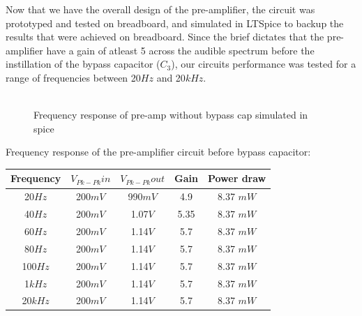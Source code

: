 \documentclass[a4paper,11pt]{article}
\begin{document}
Now that we have the overall design of the pre-amplifier, the circuit was prototyped and tested on breadboard, and simulated in LTSpice to backup the results that were achieved on breadboard. Since the brief dictates that the pre-amplifier have a gain of atleast 5 across the audible spectrum before the instillation of the bypass capacitor ($C_3$),  our circuits performance was tested for a range of frequencies between 20$Hz$ and 20$kHz$. \\\\


\begin{figure}

\begin{center}
\vspace{-8pt}
\end{center}
\vspace{-8pt}
\caption{Frequency response of pre-amp without bypass cap simulated in spice}
\vspace{-3cm}
\end{figure}

Frequency response of the pre-amplifier circuit before bypass capacitor:\\
\begin{tabular}{|c|c|c|c|c|}  
\hline
Frequency &\(\displaystyle V_{Pk-Pk}in\)  & \(\displaystyle V_{Pk-Pk} out\) & Gain & Power draw\\
\hline
20\(\displaystyle Hz \) & 200\(\displaystyle mV\)     &  990\(\displaystyle mV\)  & 4.9    & 8.37 \(\displaystyle mW\)\\
40\(\displaystyle Hz \) &  200\(\displaystyle mV\)    &  1.07\(\displaystyle V\)    & 5.35  & 8.37 \(\displaystyle mW\)\\
60\(\displaystyle Hz \) &  200\(\displaystyle mV\)    & 1.14\(\displaystyle V\)     & 5.7    & 8.37 \(\displaystyle mW\)  \\
80\(\displaystyle Hz \)&  200\(\displaystyle mV\)     &  1.14\(\displaystyle V\)    & 5.7    & 8.37 \(\displaystyle mW\)\\
100\(\displaystyle Hz \)&  200\(\displaystyle mV\)  &  1.14\(\displaystyle V\)     & 5.7    & 8.37 \(\displaystyle mW\) \\
1\(\displaystyle k Hz \)&  200\(\displaystyle mV\)    &  1.14\(\displaystyle V\)     & 5.7    & 8.37 \(\displaystyle mW\)\\
20\(\displaystyle k Hz \)& 200\(\displaystyle mV\)   &  1.14\(\displaystyle V\)    & 5.7    & 8.37 \(\displaystyle mW\) \\
\hline
\end{tabular}\\\\
\end{document}
